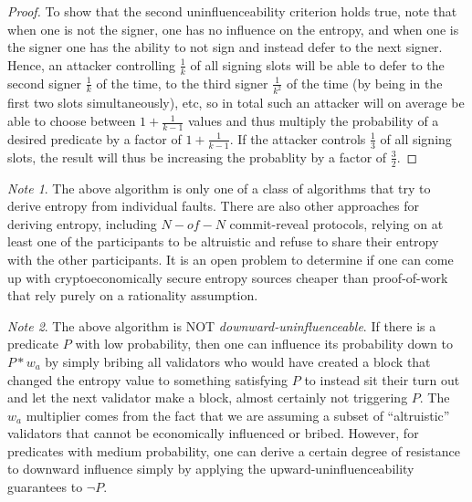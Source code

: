 \documentclass[11pt,a4paper]{article}
\theoremstyle{plain}
\theoremstyle{definition}
\theoremstyle{remark}
\newtheorem*{note}{Note}
\begin{document}
\begin{proof}
To show that the second uninfluenceability criterion holds true, note that when one is not the signer, one has no influence on the entropy, and when one is the signer one has the ability to not sign and instead defer to the next signer. Hence, an attacker controlling $\frac{1}{k}$ of all signing slots will be able to defer to the second signer $\frac{1}{k}$ of the time, to the third signer $\frac{1}{k^2}$ of the time (by being in the first two slots simultaneously), etc, so in total such an attacker will on average be able to choose between $1 + \frac{1}{k-1}$ values and thus multiply the probability of a desired predicate by a factor of $1 + \frac{1}{k-1}$. If the attacker controls $\frac{1}{3}$ of all signing slots, the result will thus be increasing the probablity by a factor of $\frac{3}{2}$.
\end{proof}

\begin{note}
The above algorithm is only one of a class of algorithms that try to derive entropy from individual faults. There are also other approaches for deriving entropy, including $N-of-N$ commit-reveal protocols, relying on at least one of the participants to be altruistic and refuse to share their entropy with the other participants. It is an open problem to determine if one can come up with cryptoeconomically secure entropy sources cheaper than proof-of-work that rely purely on a rationality assumption.
\end{note}

\begin{note}
The above algorithm is NOT \emph{downward-uninfluenceable}. If there is a predicate $P$ with low probability, then one can influence its probability down to $P * w_a$ by simply bribing all validators who would have created a block that changed the entropy value to something satisfying $P$ to instead sit their turn out and let the next validator make a block, almost certainly not triggering $P$. The $w_a$ multiplier comes from the fact that we are assuming a subset of ``altruistic'' validators that cannot be economically influenced or bribed. However, for predicates with medium probability, one can derive a certain degree of resistance to downward influence simply by applying the upward-uninfluenceability guarantees to $\neg P$.
\end{note}
\end{document}
